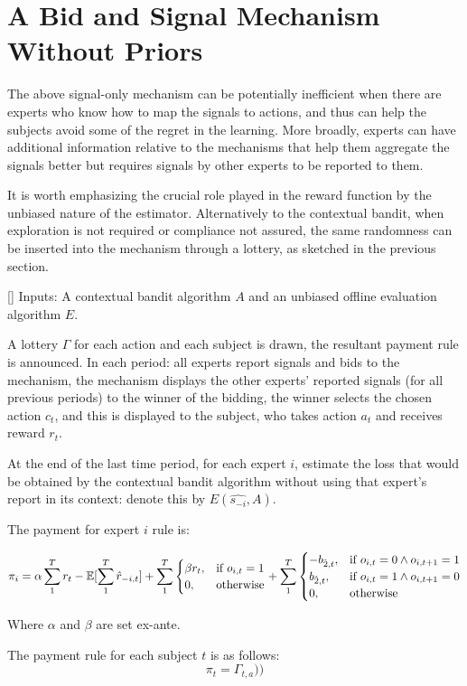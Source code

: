 \section{A Bid and Signal Mechanism Without Priors}



The above signal-only mechanism can be potentially inefficient when there are experts who know how to map the signals to actions, and thus can help the subjects avoid some of the regret in the learning.
More broadly, experts can have additional information relative to the mechanisms that help them aggregate the signals better but requires signals by other experts to be reported to them. 

It is worth emphasizing the crucial role played in the reward function by the unbiased nature of the estimator.
Alternatively to the contextual bandit, when exploration is not required or compliance not assured, the same randomness can be inserted into the mechanism through a lottery, as sketched in the previous section.


\begin{mech}\label{mech:bidbandit}[]
Inputs: A contextual bandit algorithm $A$ and an unbiased offline evaluation algorithm $E$.


A lottery $\Gamma$ for each action and each subject is drawn, the resultant payment rule is announced.
In each period: all experts report signals and bids to the mechanism, the mechanism displays the other experts' reported signals (for all previous periods) to the winner of the bidding, the winner selects the chosen action $c_t$, and this is displayed to the subject, who takes action $a_t$ and receives reward $r_t$.

At the end of the last time period, for each expert $i$, estimate the loss that would be obtained by the contextual bandit algorithm without using that expert's report in its context: denote this by $E(\hat{s_{-i}},A)$.

The payment for expert $i$ rule is:

\[
    \pi_i = 
\alpha \sum_1^T r_t -  \operatorname*{\mathbb E}[\sum_1^T \hat{r}_{-i,t}]
+
\sum_1^T
\begin{cases}
    \beta r_t ,& \text{if } o_{i,t} = 1\\
     0,              & \text{otherwise}
\end{cases}
+
\sum_1^T
\begin{cases}
     - b_{\hat{2},t} ,& \text{if } o_{i,t} = 0 \land o_{i,t+1} = 1\\
       b_{\hat{2},t} ,& \text{if } o_{i,t} = 1 \land o_{i,t+1} = 0 \\
	   0,              & \text{otherwise}
\end{cases}
\]

Where $\alpha$ and $\beta$ are set ex-ante. 


The payment rule for each subject $t$ is as follows:
\[
    \pi_t =  \Gamma_{t,a}))
\]

\end{mech}


